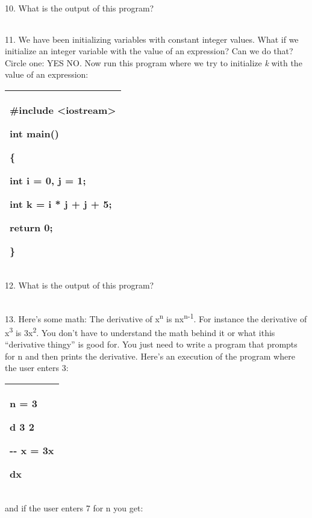 \documentclass[
]{article}
\begin{document}
10. What is the output of this program?

\begin{longtable}[]{@{}@{}}
\toprule
\endhead
\bottomrule
\end{longtable}

11. We have been initializing variables with constant integer values.
What if we initialize an integer variable with the value of an
expression? Can we do that? Circle one: YES NO. Now run this program
where we try to initialize \emph{k} with the value of an expression:

\begin{longtable}[]{@{}l@{}}
\toprule
\endhead
\begin{minipage}[t]{0.97\columnwidth}\raggedright
\#include \textless iostream\textgreater{}

int main()

\{

int i = 0, j = 1;

int k = i * j + j + 5;

return 0;

\}\strut
\end{minipage}\tabularnewline
\bottomrule
\end{longtable}

12. What is the output of this program?

\begin{longtable}[]{@{}@{}}
\toprule
\endhead
\bottomrule
\end{longtable}

13. Here's some math: The derivative of x\textsuperscript{n} is
nx\textsuperscript{n-1}. For instance the derivative of
x\textsuperscript{3} is 3x\textsuperscript{2}. You don't have to
understand the math behind it or what ithis ``derivative thingy'' is
good for. You just need to write a program that prompts for n and then
prints the derivative. Here's an execution of the program where the user
enters 3:

\begin{longtable}[]{@{}l@{}}
\toprule
\endhead
\begin{minipage}[t]{0.97\columnwidth}\raggedright
n = \textbf{3}

d 3 2

-\/- x = 3x

dx\strut
\end{minipage}\tabularnewline
\bottomrule
\end{longtable}

and if the user enters 7 for n you get:
\end{document}
